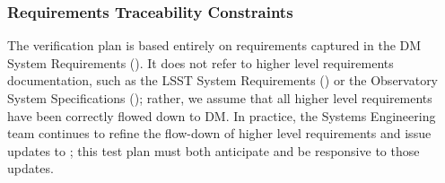 \subsubsection{Requirements Traceability Constraints}

The \product{} verification plan is based entirely on requirements captured in the DM System Requirements ().
It does not refer to higher level requirements documentation, such as the LSST System Requirements () or the Observatory System Specifications (); rather, we assume that all higher level requirements have been correctly flowed down to DM.
In practice, the Systems Engineering team continues to refine the flow-down of higher level requirements and issue updates to ; this test plan must both anticipate and be responsive to those updates.
